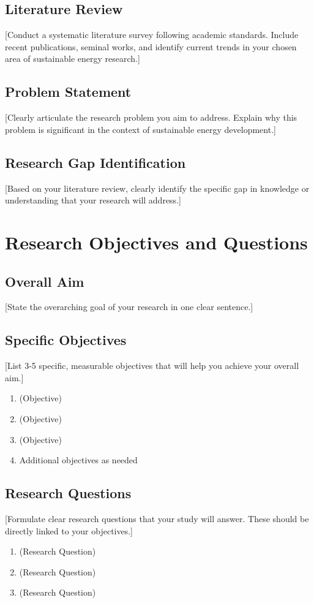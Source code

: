 \documentclass[12pt,a4paper]{article}
\begin{document}
\subsection{Literature Review}
[Conduct a systematic literature survey following academic standards. Include recent publications, seminal works, and identify current trends in your chosen area of sustainable energy research.]

\subsection{Problem Statement}
[Clearly articulate the research problem you aim to address. Explain why this problem is significant in the context of sustainable energy development.]

\subsection{Research Gap Identification}
[Based on your literature review, clearly identify the specific gap in knowledge or understanding that your research will address.]

\section{Research Objectives and Questions}
\label{sec:objectives}

\subsection{Overall Aim}
[State the overarching goal of your research in one clear sentence.]

\subsection{Specific Objectives}
[List 3-5 specific, measurable objectives that will help you achieve your overall aim.]
\begin{enumerate}
    \item (Objective)
    \item (Objective)
    \item (Objective)
    \item Additional objectives as needed
\end{enumerate}

\subsection{Research Questions}
[Formulate clear research questions that your study will answer. These should be directly linked to your objectives.]
\begin{enumerate}
    \item (Research Question)
    \item (Research Question)
    \item (Research Question)
\end{enumerate}
\end{document}
